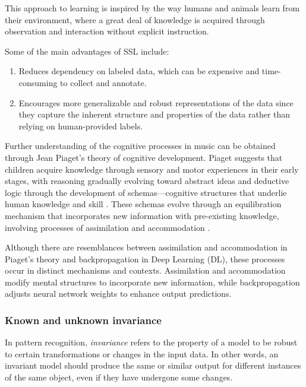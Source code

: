 This approach to learning is inspired by the way humans and animals learn from their environment, where a great deal of knowledge is acquired through observation and interaction without explicit instruction. 

Some of the main advantages of SSL include:

\begin{enumerate}
\item Reduces dependency on labeled data, which can be expensive and time-consuming to collect and annotate.
\item Encourages more generalizable and robust representations of the data since they capture the inherent structure and properties of the data rather than relying on human-provided labels.
\end{enumerate}

Further understanding of the cognitive processes in music can be obtained through Jean Piaget's theory of cognitive development. Piaget suggests that children acquire knowledge through sensory and motor experiences in their early stages, with reasoning gradually evolving toward abstract ideas and deductive logic through the development of schemas—cognitive structures that underlie human knowledge and skill \cite{Huitt2003PiagetsDevelopment}. These schemas evolve through an equilibration mechanism that incorporates new information with pre-existing knowledge, involving processes of assimilation and accommodation \cite{audioselfsupsurvey}.

Although there are resemblances between assimilation and accommodation in Piaget's theory and backpropagation in Deep Learning (DL), these processes occur in distinct mechanisms and contexts. Assimilation and accommodation modify mental structures to incorporate new information, while backpropagation adjusts neural network weights to enhance output predictions.

\subsubsection{Known and unknown invariance}

In pattern recognition, \textit{invariance} refers to the property of a model to be robust to certain transformations or changes in the input data. In other words, an invariant model should produce the same or similar output for different instances of the same object, even if they have undergone some changes.



